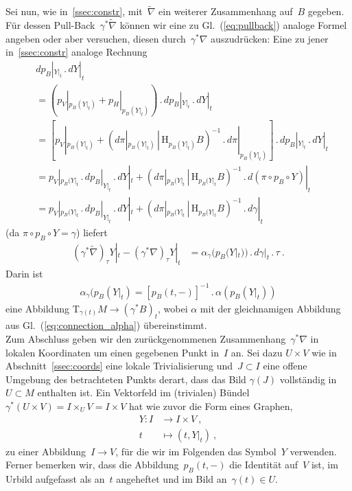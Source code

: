 \documentclass[10pt,a4paper]{article}
\begin{document}
Sei nun, wie in~\ref{ssec:constr}, mit~$\tilde{\nabla}$ ein weiterer Zusammenhang auf~$B$ gegeben.
Für dessen Pull-Back~$\gamma^*\tilde{\nabla}$ können wir eine zu Gl.~(\ref{eq:pullback}) analoge Formel angeben oder aber versuchen, diesen durch~$\gamma^*\nabla$ auszudrücken: Eine zu jener in~\ref{ssec:constr} analoge Rechnung
\begin{align*}
&dp_B|_{Y|_t}\,.\,dY|_t
\nonumber\\
&= \left(
p_V|_{p_B(Y|_t)} + p_H|_{p_B(Y|_t)}
\right)\,.\,
dp_B|_{Y|_t}\,.\,dY|_t
\nonumber\\
&= 
\left[
p_V|_{p_B(Y|_t)} +
(d\pi|_{p_B(Y|_t)}\,|\, \mathrm{H}_{p_B(Y|_t)}B)^{-1}\,.\,d\pi|_{p_B(Y|_t)}
\right]\,.\,
dp_B|_{Y|_t}\,.\,dY|_t
\nonumber\\
&= 
p_V|_{p_B(Y|_t}\,.\,dp_B|_{Y|_t}\,.\,dY|_t
+ (d\pi|_{p_B(Y|_t}\,|\, \mathrm{H}_{p_B(Y|_t}B)^{-1}
\,.\,d(\pi\circ p_B\circ Y)|_t
\nonumber\\
&= 
p_V|_{p_B(Y|_t}\,.\,dp_B|_{Y|_t}\,.\,dY|_t
+ (d\pi|_{p_B(Y|_t}\,|\, \mathrm{H}_{p_B(Y|_t}B)^{-1}
\,.\,d\gamma|_t
\end{align*}
(da $\pi\circ p_B\circ Y=\gamma$) liefert
\begin{align*}
(\gamma^*\tilde{\nabla})_\tau Y|_t
- (\gamma^*\nabla)_\tau Y|_t
&=
\alpha_\gamma(p_B(Y|_t))\,.\,d\gamma|_t\,.\,\tau
\ .
\end{align*}
Darin ist
\begin{align*}
\alpha_\gamma(p_B(Y|_t) = [p_B(t,-)]^{-1}\,.\,\alpha(p_B(Y|_t))
\end{align*}
eine Abbildung $\mathrm{T}_{\gamma(t)}M \rightarrow (\gamma^*B)_t$, wobei $\alpha$ mit der gleichnamigen Abbildung aus Gl.~(\ref{eq:connection_alpha}) übereinstimmt.\\

Zum Abschluss geben wir den zurückgenommenen Zusammenhang~$\gamma^*\nabla$ in lokalen Koordinaten um einen gegebenen Punkt in~$I$ an.
Sei dazu $U\times V$ wie in Abschnitt~\ref{ssec:coords} eine lokale Trivialisierung und~$J\subset I$ eine offene Umgebung des betrachteten Punkts derart, dass das Bild $\gamma(J)$ vollständig in~$U\subset M$ enthalten ist.
Ein Vektorfeld im (trivialen) Bündel $\gamma^*(U\times V)=I\times_U V=I\times V$ hat wie zuvor die Form eines Graphen,
\begin{align*}
Y: I&\rightarrow I\times V
\ ,\nonumber\\
t&\mapsto (t, Y|_t)
\ ,
\end{align*}
zu einer Abbildung~$I\rightarrow V$, für die wir im Folgenden das Symbol~$Y$ verwenden.
Ferner bemerken wir, dass die Abbildung~$p_B(t,-)$ die Identität auf~$V$ ist, im Urbild aufgefasst als an~$t$ angeheftet und im Bild an~$\gamma(t)\in U$.
\end{document}
